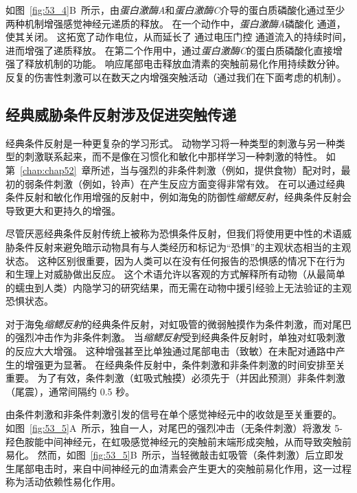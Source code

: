 如图~\ref{fig:53_4}B~所示，由\textit{蛋白激酶A}和\textit{蛋白激酶C}介导的蛋白质磷酸化通过至少两种机制增强感觉神经元递质的释放。
在一个动作中，\textit{蛋白激酶A}磷酸化  通道，使其关闭。 这拓宽了动作电位，从而延长了  通过电压门控  通道流入的持续时间，进而增强了递质释放。
在第二个作用中，通过\textit{蛋白激酶C}的蛋白质磷酸化直接增强了释放机制的功能。
响应尾部电击释放血清素的突触前易化作用持续数分钟。
反复的伤害性刺激可以在数天之内增强突触活动（通过我们在下面考虑的机制）。



\subsection{经典威胁条件反射涉及促进突触传递}

经典条件反射是一种更复杂的学习形式。
动物学习将一种类型的刺激与另一种类型的刺激联系起来，而不是像在习惯化和敏化中那样学习一种刺激的特性。
如第~\ref{chap:chap52}~章所述，当与强烈的非条件刺激（例如，提供食物）配对时，最初的弱条件刺激（例如，铃声）在产生反应方面变得非常有效。
在可以通过经典条件反射和敏化作用增强的反射中，例如海兔的防御性\textit{缩鳃反射}，经典条件反射会导致更大和更持久的增强。


尽管厌恶经典条件反射传统上被称为恐惧条件反射，但我们将使用更中性的术语威胁条件反射来避免暗示动物具有与人类经历和标记为“恐惧”的主观状态相当的主观状态。 这种区别很重要，因为人类可以在没有任何报告的恐惧感的情况下在行为和生理上对威胁做出反应。
这个术语允许以客观的方式解释所有动物（从最简单的蠕虫到人类）内隐学习的研究结果，而无需在动物中援引经验上无法验证的主观恐惧状态。


对于海兔\textit{缩鳃反射}的经典条件反射，对虹吸管的微弱触摸作为条件刺激，而对尾巴的强烈冲击作为非条件刺激。
当\textit{缩鳃反射}受到经典条件反射时，单独对虹吸刺激的反应大大增强。
这种增强甚至比单独通过尾部电击（致敏）在未配对通路中产生的增强更为显著。 
在经典条件反射中，条件刺激和非条件刺激的时间安排至关重要。
为了有效，条件刺激（虹吸式触摸）必须先于（并因此预测）非条件刺激（尾震），通常间隔约 0.5 秒。


由条件刺激和非条件刺激引发的信号在单个感觉神经元中的收敛是至关重要的。
如图~\ref{fig:53_5}A~所示，独自一人，对尾巴的强烈冲击（无条件刺激）将激发 5-羟色胺能中间神经元，在虹吸感觉神经元的突触前末端形成突触，从而导致突触前易化。
然而，如图~\ref{fig:53_5}B~所示，当轻微敲击虹吸管（条件刺激）后立即发生尾部电击时，来自中间神经元的血清素会产生更大的突触前易化作用，这一过程称为活动依赖性易化作用。


